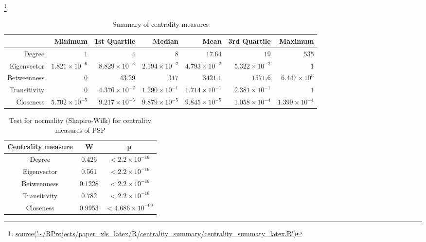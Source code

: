 \footnote{\url{source('~/RProjects/paper_xls_latex/R/centrality_summary/centrality_summary_latex.R')}}
\begin{table}[ht]
\centering
\begin{tabular}{rrrrrrr}
  \hline
 & Minimum & 1st Quartile & Median & Mean & 3rd Quartile & Maximum \\ 
  \hline
Degree & $1 $ & $4 $ & $8 $ & $17.64$  & $19$ & $535$ \\ 
  Eigenvector & $1.821 \times 10^{-6}$ & $8.829 \times 10^{-3}$ & $2.194 \times 10^{-2}$ & $4.793 \times 10^{-2}$ & $5.322 \times 10^{-2}$ & $1 $ \\ 
  Betweenness & $0 $ & $43.29 $ & $317 $ & $3421.1$ & $1571.6$& $6.447 \times 10^{5}$ \\ 
  Transitivity & $0 $ & $4.376 \times 10^{-2}$ & $1.290 \times 10^{-1}$ & $1.714 \times 10^{-1}$ & $2.381 \times 10^{-1}$ & $1 $ \\ 
  Closeness & $5.702 \times 10^{-5}$ & $9.217 \times 10^{-5}$ & $9.879 \times 10^{-5}$ & $9.845 \times 10^{-5}$ & $1.058 \times 10^{-4}$ & $1.399 \times 10^{-4}$ \\ 
   \hline
\end{tabular}
\caption{Summary of centrality measures} 
\label{Table:Summary of centrality measures}
\end{table}


\begin{table}[h]
    \centering
    \begin{tabular}{c|c|c}
       Centrality measure  &  W& p\\
       \hline
       
       Degree  & 0.426 & $<2.2 \times 10^{-16}$ \\
       Eigenvector &0.561  & $<2.2 \times 10^{-16}$ \\
       Betweenness &0.1228& $<2.2 \times 10^{-16}$ \\
       Transitivity &0.782 & $<2.2 \times 10^{-16}$\\
       Closeness &0.9953& $<4.686 \times 10^{-09}$\\ 
    \end{tabular}
    \caption{Test for normality (Shapiro-Wilk) for centrality measures of PSP}
    \label{Table:Test for normality (Shapiro-Wilk) for centrality measures of PSP}
\end{table}

